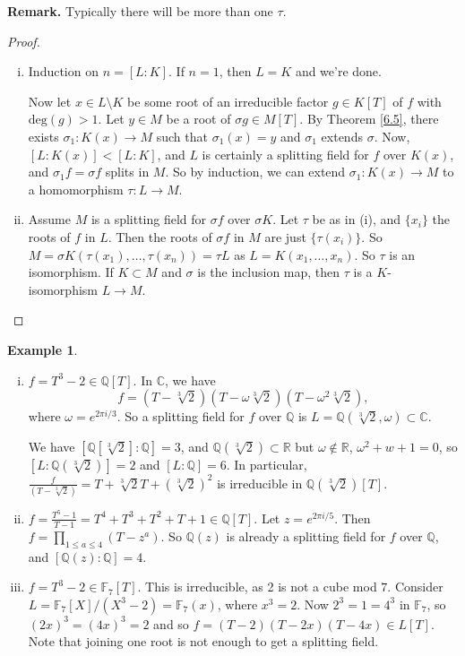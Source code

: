 \documentclass{article}
\theoremstyle{definition}
\newtheorem{example}{Example}[section]
\begin{document}
\textbf{Remark.} Typically there will be more than one $\tau$.

\begin{proof}
    \begin{enumerate}[(i)]
        \item Induction on $n = [L:K]$. If $n=1$, then $L=K$ and we're done.

        Now let $x \in L \setminus K$ be some root of an irreducible factor $g \in K[T]$ of $f$ with $\text{deg}(g)>1$. Let $y \in M$ be a root of $\sigma g \in M[T]$. By Theorem \ref{6.5}, there exists $\sigma_1 : K(x) \to M$ such that $\sigma_1(x) = y$ and $\sigma_1$ extends $\sigma.$ Now, $[L : K(x)] < [L : K]$, and $L$ is certainly a splitting field for $f$ over $K(x)$, and $\sigma_1 f =\sigma f$ splits in $M$. So by induction, we can extend $\sigma_1 : K(x) \to M$ to a homomorphism $\tau : L \to M$.
        \item Assume $M$ is a splitting field for $\sigma f$ over $\sigma K$. Let $\tau$ be as in (i), and $\{x_i\}$ the roots of $f$ in $L$. Then the roots of $\sigma f$ in $M$ are just $\{\tau(x_i)\}$. So $M = \sigma K (\tau(x_1),\ldots,\tau(x_n)) = \tau L$ as $L = K(x_1,\ldots,x_n)$. So $\tau$ is an isomorphism. If $K \subset M$ and $\sigma$ is the inclusion map, then $\tau$ is a $K$-isomorphism $L \to M$.
    \end{enumerate}
\end{proof}
\begin{example}
    \begin{enumerate}[(i)]
        \item $f = T^3-2 \in \mathbb{Q}[T]$. In $\mathbb{C}$, we have $$f=(T-\sqrt[3]{2})(T-\omega \sqrt[3]{2})(T-\omega^2\sqrt[3]{2}),$$ where $\omega = e^{2 \pi i /3}$. So a splitting field for $f$ over $\mathbb{Q}$ is $L=\mathbb{Q}(\sqrt[3]{2}, \omega) \subset \mathbb{C}$.

        We have $[\mathbb{Q}[\sqrt[3]{2}] : \mathbb{Q}] = 3$, and $\mathbb{Q}(\sqrt[3]{2}) \subset \mathbb{R}$ but $\omega \not\in \mathbb{R}$, $\omega^2+w+1=0$, so $[L : \mathbb{Q}(\sqrt[3]{2})] = 2$ and $[L:\mathbb{Q}]=6$. In particular, $\frac{f}{(T-\sqrt[3]{2})}=T+\sqrt[3]{2}T+(\sqrt[3]{2})^2$ is irreducible in $\mathbb{Q}(\sqrt[3]{2})[T].$
        \item $f = \frac{T^5-1}{T-1} = T^4 + T^3+T^2+T+1 \in \mathbb{Q}[T]$. Let $z = e^{2\pi i/5}$. Then $f = \prod_{1\le a\le 4}^{} (T-z^{a})$. So $\mathbb{Q}(z)$ is already a splitting field for $f$ over $\mathbb{Q}$, and $[\mathbb{Q}(z):\mathbb{Q}]=4$.
        \item $f = T^3-2 \in \mathbb{F}_7[T]$. This is irreducible, as 2 is not a cube mod $7$. Consider $L=\mathbb{F}_7[X]/(X^3-2) = \mathbb{F}_7(x)$, where $x^3=2$. Now $2^3=1=4^3$ in $\mathbb{F}_7$, so $(2x)^3=(4x)^3=2$ and so $f = (T-2)(T-2x)(T-4x) \in L[T]$. Note that joining one root is not enough to get a splitting field.
    \end{enumerate}
\end{example}
\end{document}
